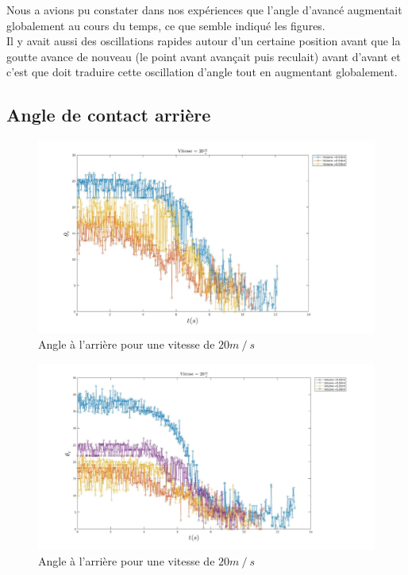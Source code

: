 \documentclass[french]{article}
\begin{document}
Nous a avions pu constater dans nos expériences que l'angle d'avancé augmentait globalement au cours du temps, ce que semble indiqué les figures.\\

Il y avait aussi des oscillations rapides autour d'un certaine position avant que la goutte avance de nouveau (le point avant avançait puis reculait) avant d'avant et c'est que doit traduire cette oscillation d'angle tout en augmentant globalement.

\newpage
\subsection{Angle de contact arrière}
\begin{figure}[ht]
	\centering
	\includegraphics[width = \linewidth]{./image/v=20or_1.jpg}
	\caption{Angle à l'arrière pour une vitesse de $20m\mathbin{/}s$}
\end{figure}
\begin{figure}[ht]
	\centering
	\includegraphics[width = \linewidth]{./image/v=20or_2.jpg}
	\caption{Angle à l'arrière pour une vitesse de $20m\mathbin{/}s$}
\end{figure}
\end{document}
